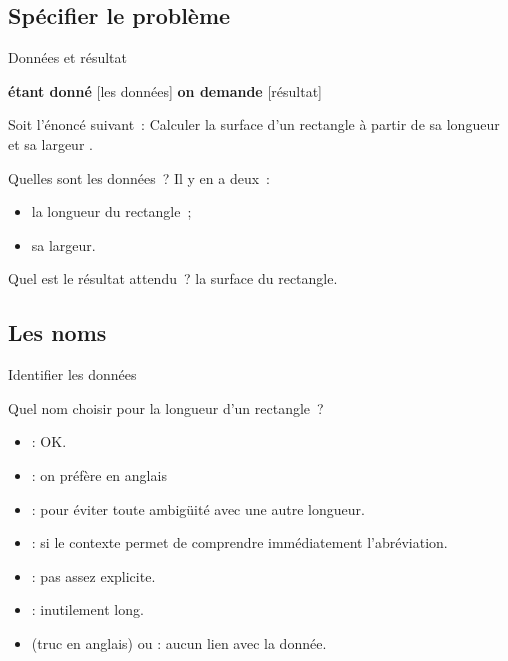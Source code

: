 \begin{hideedit}
\section{Spécifier le problème}
\frame{\sectionpage}
\begin{frame}{Données et résultat}
  \begin{block}{}
  \begin{center}
    {\textbf{étant donné} [les données]
    \textbf{on demande} [résultat]}
  \end{center}
  \end{block}
  \pause
  \begin{example}
    Soit l’énoncé suivant~:
    \og
      Calculer la surface d’un rectangle
      à partir de sa longueur et sa largeur
    \fg.

    Quelles sont les données~? \pause Il y en a deux~:
    \begin{itemize}
            \item la longueur du rectangle~;
            \item sa largeur.
    \end{itemize}

    \pause
    Quel est le résultat attendu~? \pause la surface du rectangle.
  \end{example}
\end{frame}

\subsection{Les noms}
\begin{frame}{Identifier les données}

  \begin{example}
  Quel nom choisir pour la longueur d’un rectangle~?

  \pause
  \begin{itemize}
    \item
       \pause: OK.
    \pause
    \item
       \pause: on préfère en anglais
    \pause
    \item
       \pause: pour éviter toute ambigüité avec une
      autre longueur.
    \pause
    \item
       \pause: si le contexte permet de comprendre immédiatement
      l’abréviation.
    \pause
    \item
       \pause: pas assez explicite.
    \pause
    \item
       \pause: inutilement long.
    \pause
    \item
       (truc en anglais) ou \pause: aucun lien avec la donnée.
  \end{itemize}
  \end{example}
\end{frame}


\end{hideedit}
